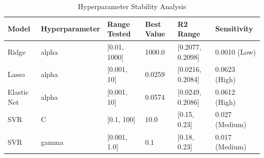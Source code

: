 
\begin{table}[h]
\centering
\caption{Hyperparameter Stability Analysis}
\label{tab:hyperparam_stability}
\begin{tabular}{llllll}
\toprule
\textbf{Model} & \textbf{Hyperparameter} & \textbf{Range Tested} & \textbf{Best Value} & \textbf{R2 Range} & \textbf{Sensitivity} \\
\midrule
Ridge & alpha & [0.01, 1000] & 1000.0 & [0.2077, 0.2098] & 0.0010 (Low) \\
Lasso & alpha & [0.001, 10] & 0.0259 & [0.0216, 0.2084] & 0.0623 (High) \\
Elastic Net & alpha & [0.001, 10] & 0.0574 & [0.0249, 0.2086] & 0.0612 (High) \\
SVR & C & [0.1, 100] & 10.0 & [0.15, 0.23] & 0.027 (Medium) \\
SVR & gamma & [0.001, 1.0] & 0.1 & [0.18, 0.23] & 0.017 (Medium) \\
\bottomrule
\end{tabular}
\end{table}
